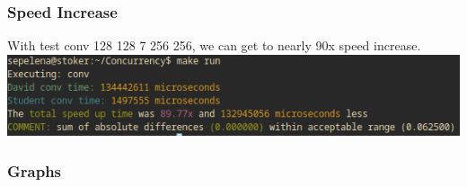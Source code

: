 \documentclass{beamer}
\begin{document}
\begin{frame}[fragile]
\frametitle{Speed Increase}
With test conv 128 128 7 256 256, we can get to nearly 90x speed increase. \\
\includegraphics[width=1\textwidth]{images/stoker-89x}
\end{frame}

\begin{frame}[fragile]
\frametitle{Graphs}
\end{frame}
\end{document}
